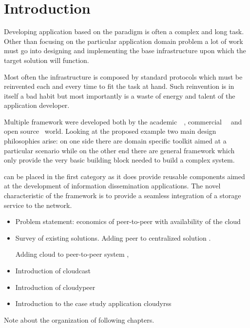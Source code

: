 \chapter{Introduction}

Developing application based on the \ptop paradigm is often a complex
and long task. Other than focusing on the particular application
domain problem a lot of work must go into designing and implementing
the base infrastructure upon which the target solution will function.

Most often the infrastructure is composed by standard protocols which
must be reinvented each and every time to fit the task at hand. Such
reinvention is in itself a bad habit but most importantly is a waste
of energy and talent of the application developer.

Multiple framework were developed both by the
academic~\cite{AntHill}~\cite{P2PFramework},
commercial~\cite{JXTA}~\cite{dotNETp2p} and open source~\cite{GNUnet}
world. Looking at the proposed example two main design philosophies
arise: on one side there are domain specific toolkit aimed at a
particular scenario while on the other end there are general framework
which only provide the very basic building block needed to build a
complex system.

\cloudypeer can be placed in the first category as it does provide
reusable components aimed at the development of information
dissemination applications. The novel characteristic of the framework
is to provide a seamless integration of a storage \cloud service to
the \ptop network.


\begin{itemize}
  \item Problem statement: economics of peer-to-peer with availability
    of the cloud
  \item Survey of existing solutions.
    Adding peer to centralized solution \cite{PeerAssistedVoD}
    \cite{BitTorrentRobustness}
    \cite{RapidCloudProvisioningLeaveragingP2P} \cite{AmazingStore}.

    Adding cloud to peer-to-peer system \cite{AngelsInCloud}, \cite{PeerAssistredOnlineDataBackup}

  \item Introduction of cloudcast
  \item Introduction of cloudypeer
  \item Introduction to the case study application cloudyrss
\end{itemize}

Note about the organization of following chapters.
